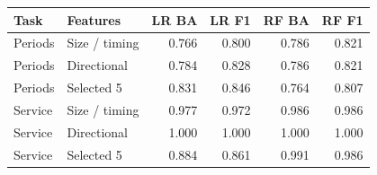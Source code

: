 \begin{tabular}{@{}llrrrr@{}}
\toprule
Task & Features & LR BA & LR F1 & RF BA & RF F1 \\
\midrule
Periods & Size / timing & 0.766 & 0.800 & 0.786 & 0.821 \\
Periods & Directional & 0.784 & 0.828 & 0.786 & 0.821 \\
Periods & Selected 5 & 0.831 & 0.846 & 0.764 & 0.807 \\
\midrule
Service & Size / timing & 0.977 & 0.972 & 0.986 & 0.986 \\
Service & Directional & 1.000 & 1.000 & 1.000 & 1.000 \\
Service & Selected 5 & 0.884 & 0.861 & 0.991 & 0.986 \\
\bottomrule
\end{tabular}
